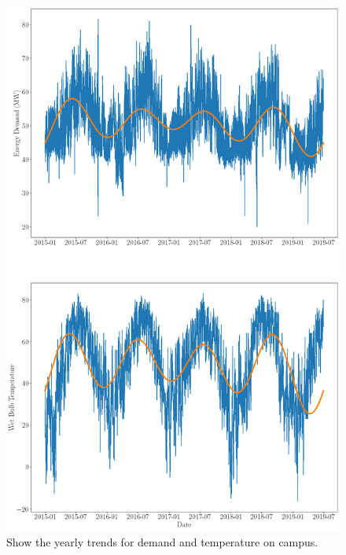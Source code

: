 	\begin{figure}[H]
	  \centering
	  \includegraphics[width=\textwidth]{./figures/yearlytrends.png}
	  \caption{Show the yearly trends for demand and temperature on campus.}
	  \label{fig:yearlytrends}
	\end{figure}



